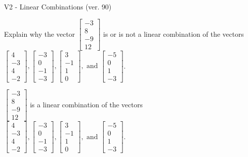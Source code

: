 \begin{exercise}
  \begin{exerciseTitle}V2 - Linear Combinations (ver. 90)\end{exerciseTitle}
  \begin{exerciseStatement}
    Explain why the vector \(\left[\begin{array}{c}
-3 \\
8 \\
-9 \\
12
\end{array}\right]\)  is or is not a linear 
	combination of the vectors \(\left[\begin{array}{c}
4 \\
-3 \\
4 \\
-2
\end{array}\right] , \left[\begin{array}{c}
-3 \\
0 \\
-1 \\
-3
\end{array}\right] , \left[\begin{array}{c}
3 \\
-1 \\
1 \\
0
\end{array}\right] , \text{ and } \left[\begin{array}{c}
-5 \\
0 \\
1 \\
-3
\end{array}\right]\).
	


  \end{exerciseStatement}
  \begin{exerciseAnswer}
   \(\left[\begin{array}{c}
-3 \\
8 \\
-9 \\
12
\end{array}\right]\) 
  	 is  
	a linear combination of the vectors \(\left[\begin{array}{c}
4 \\
-3 \\
4 \\
-2
\end{array}\right] , \left[\begin{array}{c}
-3 \\
0 \\
-1 \\
-3
\end{array}\right] , \left[\begin{array}{c}
3 \\
-1 \\
1 \\
0
\end{array}\right] , \text{ and } \left[\begin{array}{c}
-5 \\
0 \\
1 \\
-3
\end{array}\right]\).


\end{exerciseAnswer}
\end{exercise}
